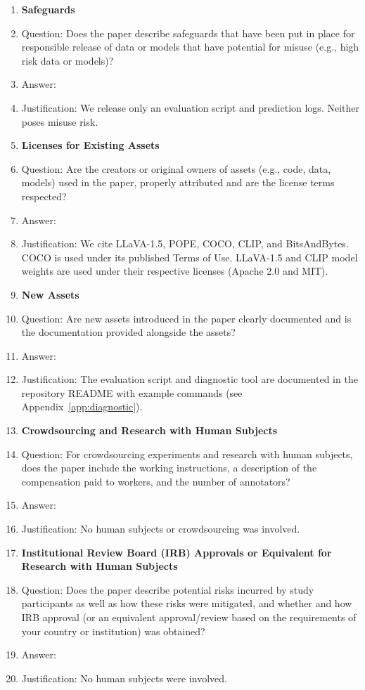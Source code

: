 \begin{enumerate}
\item {\bf Safeguards}
\item[] Question: Does the paper describe safeguards that have been put in place
for responsible release of data or models that have potential for misuse (e.g.,
high risk data or models)?
\item[] Answer: \answerNA{}
\item[] Justification: We release only an evaluation script and prediction logs.
Neither poses misuse risk.

\item {\bf Licenses for Existing Assets}
\item[] Question: Are the creators or original owners of assets (e.g., code,
data, models) used in the paper, properly attributed and are the license terms
respected?
\item[] Answer: \answerYes{}
\item[] Justification: We cite LLaVA-1.5, POPE, COCO, CLIP, and BitsAndBytes.
COCO is used under its published Terms of Use. LLaVA-1.5 and CLIP model weights
are used under their respective licenses (Apache 2.0 and MIT).

\item {\bf New Assets}
\item[] Question: Are new assets introduced in the paper clearly documented and
is the documentation provided alongside the assets?
\item[] Answer: \answerYes{}
\item[] Justification: The evaluation script and diagnostic tool are documented
in the repository README with example commands (see Appendix~\ref{app:diagnostic}).

\item {\bf Crowdsourcing and Research with Human Subjects}
\item[] Question: For crowdsourcing experiments and research with human subjects,
does the paper include the working instructions, a description of the
compensation paid to workers, and the number of annotators?
\item[] Answer: \answerNA{}
\item[] Justification: No human subjects or crowdsourcing was involved.

\item {\bf Institutional Review Board (IRB) Approvals or Equivalent for
Research with Human Subjects}
\item[] Question: Does the paper describe potential risks incurred by study
participants as well as how these risks were mitigated, and whether and how
IRB approval (or an equivalent approval/review based on the requirements of
your country or institution) was obtained?
\item[] Answer: \answerNA{}
\item[] Justification: No human subjects were involved.

\end{enumerate}
